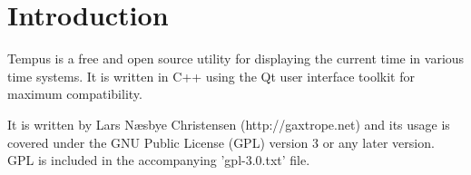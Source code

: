 \section{Introduction}
Tempus is a free and open source utility for displaying the current time in various time systems. It is written in C++ using the Qt user interface toolkit for maximum compatibility.

It is written by Lars N{\ae}sbye Christensen (http://gaxtrope.net) and its usage is covered under the GNU Public License (GPL) version 3 or any later version. GPL is included in the accompanying 'gpl-3.0.txt' file.


